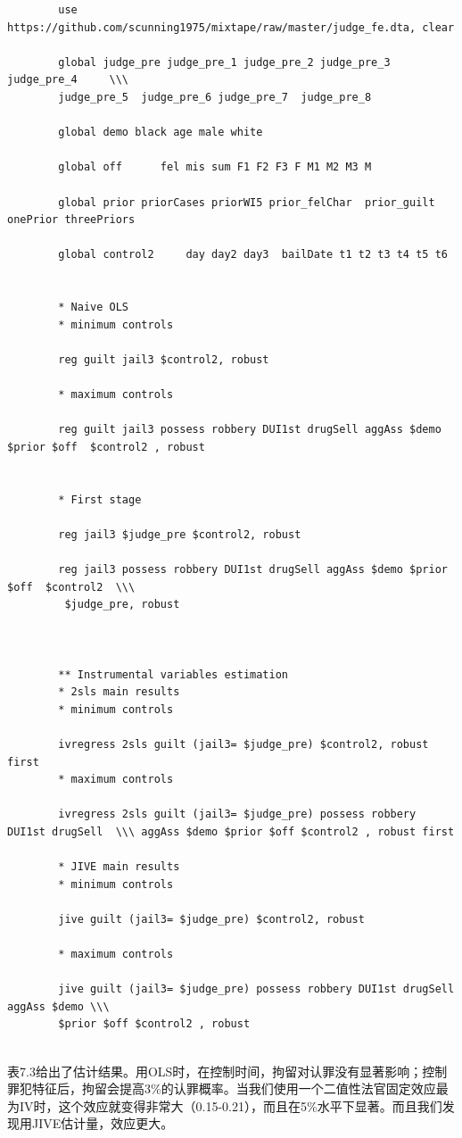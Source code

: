 \documentclass[cn,12pt,math=newtx,citestyle=gb7714-2015,bibstyle=gb7714-2015]{elegantbook}
\begin{document}
	\begin{lstlisting}
		use https://github.com/scunning1975/mixtape/raw/master/judge_fe.dta, clear
		
		global judge_pre judge_pre_1 judge_pre_2 judge_pre_3 judge_pre_4     \\\    
		judge_pre_5  judge_pre_6 judge_pre_7  judge_pre_8
		
		global demo black age male white 
		
		global off      fel mis sum F1 F2 F3 F M1 M2 M3 M 
		
		global prior priorCases priorWI5 prior_felChar  prior_guilt onePrior threePriors
		
		global control2     day day2 day3  bailDate t1 t2 t3 t4 t5 t6
		
		
		* Naive OLS
		* minimum controls
		
		reg guilt jail3 $control2, robust
		
		* maximum controls
		
		reg guilt jail3 possess robbery DUI1st drugSell aggAss $demo $prior $off  $control2 , robust
		
		
		* First stage
		
		reg jail3 $judge_pre $control2, robust
		
		reg jail3 possess robbery DUI1st drugSell aggAss $demo $prior $off  $control2  \\\
		 $judge_pre, robust
		
		
		
		** Instrumental variables estimation
		* 2sls main results
		* minimum controls
		
		ivregress 2sls guilt (jail3= $judge_pre) $control2, robust first
		* maximum controls
		
		ivregress 2sls guilt (jail3= $judge_pre) possess robbery DUI1st drugSell  \\\ aggAss $demo $prior $off $control2 , robust first
		
		* JIVE main results
		* minimum controls
		
		jive guilt (jail3= $judge_pre) $control2, robust
		
		* maximum controls
		
		jive guilt (jail3= $judge_pre) possess robbery DUI1st drugSell aggAss $demo \\\ 
		$prior $off $control2 , robust
		
	\end{lstlisting}
	
	表7.3给出了估计结果。用OLS时，在控制时间，拘留对认罪没有显著影响；控制罪犯特征后，拘留会提高3\%的认罪概率。当我们使用一个二值性法官固定效应最为IV时，这个效应就变得非常大（0.15-0.21），而且在5\%水平下显著。而且我们发现用JIVE估计量，效应更大。
	
\end{document}
